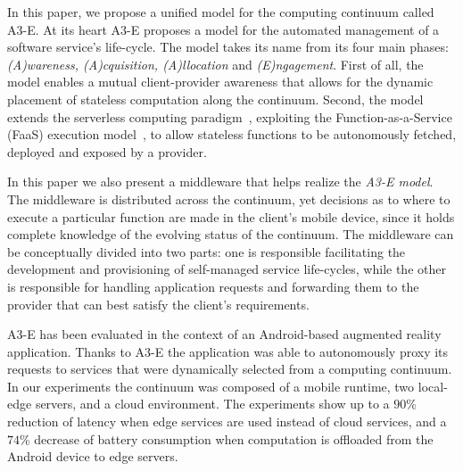 In this paper, we propose a unified model for the computing continuum called A3-E. At its heart A3-E proposes a model for the automated management of a software service's life-cycle. The model takes its name from its four main phases: \textit{(A)wareness, (A)cquisition, (A)llocation} and \textit{(E)ngagement}. First of all, the model enables a mutual client-provider awareness that allows for the dynamic placement of stateless computation along the continuum. Second, the model extends the serverless computing paradigm~\cite{Hendrickson:2016,baldini2017serverless,GarrigaMendonca2017}, exploiting the Function-as-a-Service (FaaS) execution model~\cite{MateosFaaster17}, to allow stateless functions to be autonomously fetched, deployed and exposed by a provider. 

In this paper we also present a middleware that helps realize the \textit{A3-E model}. The middleware is distributed across the continuum, yet decisions as to where to execute a particular function are made in the client's mobile device, since it holds complete knowledge of the evolving status of the continuum. The middleware can be conceptually divided into two parts: one is responsible facilitating the development and provisioning of self-managed service life-cycles, while the other is responsible for handling application requests and forwarding them to the provider that can best satisfy the client's requirements.



A3-E has been evaluated in the context of an Android-based augmented reality application. Thanks to A3-E the application was able to autonomously proxy its requests to services that were dynamically selected from a computing continuum. In our experiments the continuum was composed of a mobile runtime, two local-edge servers, and a cloud environment. The experiments show up to a $90$\% reduction of latency when edge services are used instead of cloud services, and a $74$\% decrease of battery consumption when computation is offloaded from the Android device to edge servers. 

